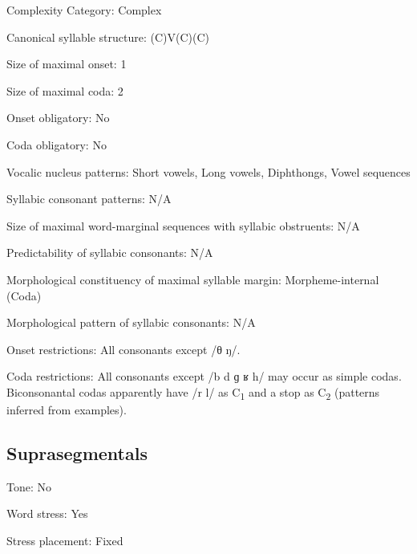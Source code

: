 {\begin{appendixdesc}
\item[Complexity Category:] Complex

\item[Canonical syllable structure:] (C)V(C)(C) \citep[12--18]{Poppe1964}

\item[Size of maximal onset:] 1

\item[Size of maximal coda:] 2

\item[Onset obligatory:] No

\item[Coda obligatory:] No

\item[Vocalic nucleus patterns:] Short vowels, Long vowels, Diphthongs, Vowel sequences

\item[Syllabic consonant patterns:] N/A

\item[Size of maximal word-marginal sequences with syllabic obstruents:] N/A

\item[Predictability of syllabic consonants:] N/A

\item[Morphological constituency of maximal syllable margin:] Morpheme-internal (Coda)

\item[Morphological pattern of syllabic consonants:] N/A

\item[Onset restrictions:] All consonants except /θ ŋ/.

\item[Coda restrictions:] All consonants except /b d ɡ ʁ h/ may occur as simple codas. Biconsonantal codas apparently have /r l/ as C\textsubscript{1} and a stop as C\textsubscript{2} (patterns inferred from examples).
\end{appendixdesc}
\subsection*{Suprasegmentals}
\begin{appendixdesc}
\item[Tone:] No

\item[Word stress:] Yes

\item[Stress placement:] Fixed


\end{appendixdesc}}
